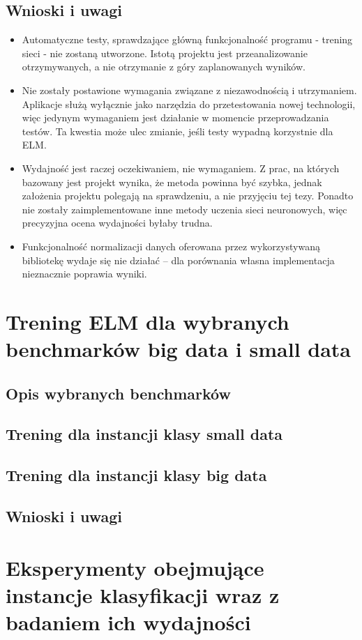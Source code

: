 \documentclass{article}
\begin{document}
\subsection{Wnioski i uwagi}
\begin{itemize}
\item Automatyczne testy, sprawdzające główną funkcjonalność programu - trening sieci - nie zostaną utworzone. Istotą projektu jest przeanalizowanie otrzymywanych, a nie otrzymanie z góry zaplanowanych wyników.
\item Nie zostały postawione wymagania związane z niezawodnością i utrzymaniem. Aplikacje służą wyłącznie jako narzędzia do przetestowania nowej technologii, więc jedynym wymaganiem jest działanie w momencie przeprowadzania testów. Ta kwestia może ulec zmianie, jeśli testy wypadną korzystnie dla ELM.
\item Wydajność jest raczej oczekiwaniem, nie wymaganiem. Z prac, na których bazowany jest projekt wynika, że metoda powinna być szybka, jednak założenia projektu polegają na sprawdzeniu, a nie przyjęciu tej tezy. Ponadto nie zostały zaimplementowane inne metody uczenia sieci neuronowych, więc precyzyjna ocena wydajności byłaby trudna.
\item Funkcjonalność normalizacji danych oferowana przez wykorzystywaną bibliotekę wydaje się nie działać -- dla porównania własna implementacja nieznacznie poprawia wyniki.
\end{itemize}
\clearpage
\section{Trening ELM dla wybranych benchmarków big data i small data}
\subsection{Opis wybranych benchmarków}
\subsection{Trening dla instancji klasy small data}
\subsection{Trening dla instancji klasy big data}
\subsection{Wnioski i uwagi}

\clearpage
\section{Eksperymenty obejmujące instancje klasyfikacji wraz z badaniem ich wydajności}
\clearpage
\end{document}
